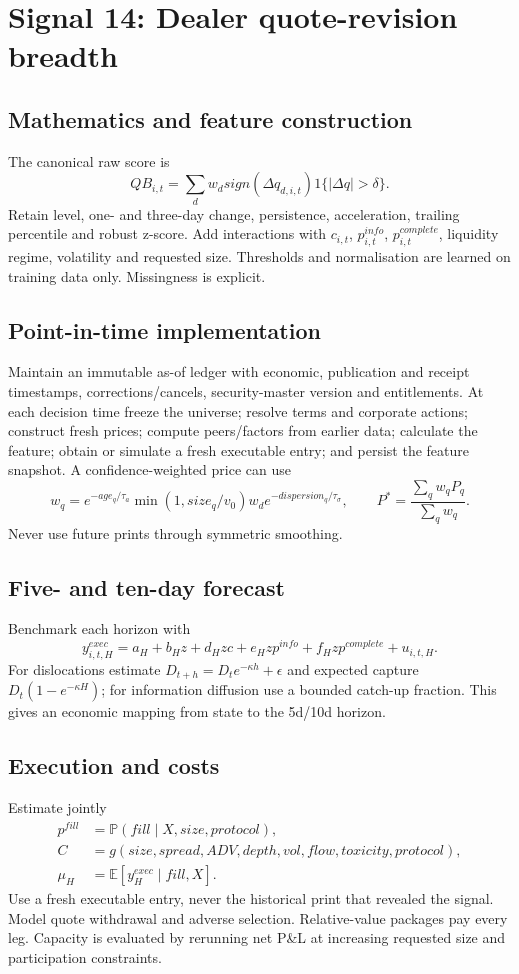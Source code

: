 \documentclass[10pt]{article}
\newcommand{\E}{\mathbb{E}}\newcommand{\Pp}{\mathbb{P}}
\begin{document}
\section{Signal 14: Dealer quote-revision breadth}
\subsection{Mathematics and feature construction}
The canonical raw score is
\begin{equation}QB_{i,t}=\sum_d w_d sign(\Delta q_{d,i,t})1\{|\Delta q|>\delta\}.\end{equation}
Retain level, one- and three-day change, persistence, acceleration, trailing percentile and robust z-score. Add interactions with $c_{i,t}$, $p^{info}_{i,t}$, $p^{complete}_{i,t}$, liquidity regime, volatility and requested size. Thresholds and normalisation are learned on training data only. Missingness is explicit.

\subsection{Point-in-time implementation}
Maintain an immutable as-of ledger with economic, publication and receipt timestamps, corrections/cancels, security-master version and entitlements. At each decision time freeze the universe; resolve terms and corporate actions; construct fresh prices; compute peers/factors from earlier data; calculate the feature; obtain or simulate a fresh executable entry; and persist the feature snapshot. A confidence-weighted price can use
\[w_q=e^{-age_q/\tau_a}\min(1,size_q/v_0)w_d e^{-dispersion_q/\tau_\sigma},\qquad P^*=\frac{\sum_qw_qP_q}{\sum_qw_q}.\]
Never use future prints through symmetric smoothing.

\subsection{Five- and ten-day forecast}
Benchmark each horizon with
\[y^{exec}_{i,t,H}=a_H+b_Hz+d_Hzc+e_Hzp^{info}+f_Hzp^{complete}+u_{i,t,H}.\]
For dislocations estimate $D_{t+h}=D_te^{-\kappa h}+\epsilon$ and expected capture $D_t(1-e^{-\kappa H})$; for information diffusion use a bounded catch-up fraction. This gives an economic mapping from state to the 5d/10d horizon.

\subsection{Execution and costs}
Estimate jointly
\begin{align}
p^{fill}&=\Pp(fill\mid X,size,protocol),\\
C&=g(size,spread,ADV,depth,vol,flow,toxicity,protocol),\\
\mu_H&=\E[y^{exec}_H\mid fill,X].
\end{align}
Use a fresh executable entry, never the historical print that revealed the signal. Model quote withdrawal and adverse selection. Relative-value packages pay every leg. Capacity is evaluated by rerunning net P\&L at increasing requested size and participation constraints.
\end{document}
